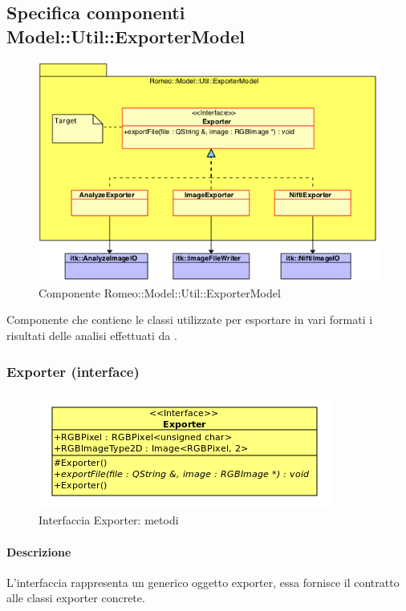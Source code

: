 \subsection{Specifica componenti Model::Util::ExporterModel}
\label{specificaExporterModel}
\begin{figure}[!h]
\centering
\includegraphics[scale=0.8]{../Specifica_Tecnica/Content/Immagini/Romeo__Model__Util__ExporterModel.png}
			\caption{Componente Romeo::Model::Util::ExporterModel}
			\label{comp_romeo::model::util::exporterrmodel}
\end{figure}
Componente che contiene le classi utilizzate per esportare in vari formati i risultati delle analisi effettuati da \project.

\subsubsection{Exporter (interface)}
\label{spexporter}
\begin{figure}[!h]
\centering
\includegraphics[scale=1]{./Content/Immagini/model/Exporter.png}
			\caption{Interfaccia Exporter: metodi}
			\label{cl_exporter}
\end{figure}
\paragraph{Descrizione \\}
L'interfaccia rappresenta un generico oggetto exporter, essa fornisce il contratto alle classi exporter concrete.

